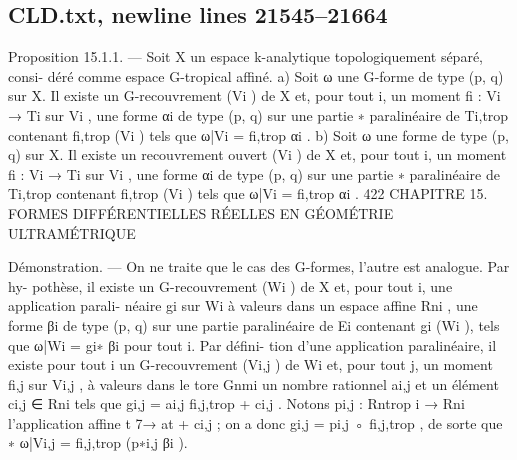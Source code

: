 \documentclass[
  10pt,
]{article}
\newenvironment{Shaded}{}{}
\newcommand{\NormalTok}[1]{#1}
\begin{document}
\subsection{CLD.txt, newline lines
21545--21664}\label{cld.txt-newline-lines-2154521664}

\begin{Shaded}
\begin{Highlighting}[]
\NormalTok{Proposition 15.1.1. — Soit X un espace k{-}analytique topologiquement séparé, consi{-}}
\NormalTok{déré comme espace G{-}tropical affiné.}
\NormalTok{   a) Soit ω une G{-}forme de type (p, q) sur X. Il existe un G{-}recouvrement (Vi ) de X et,}
\NormalTok{pour tout i, un moment fi : Vi → Ti sur Vi , une forme αi de type (p, q) sur une partie}
\NormalTok{                                                                 ∗}
\NormalTok{paralinéaire de Ti,trop contenant fi,trop (Vi ) tels que ω|Vi = fi,trop αi .}
\NormalTok{   b) Soit ω une forme de type (p, q) sur X. Il existe un recouvrement ouvert (Vi ) de X}
\NormalTok{et, pour tout i, un moment fi : Vi → Ti sur Vi , une forme αi de type (p, q) sur une partie}
\NormalTok{                                                                 ∗}
\NormalTok{paralinéaire de Ti,trop contenant fi,trop (Vi ) tels que ω|Vi = fi,trop αi .}
\NormalTok{422 CHAPITRE 15. FORMES DIFFÉRENTIELLES RÉELLES EN GÉOMÉTRIE ULTRAMÉTRIQUE}

\NormalTok{Démonstration. — On ne traite que le cas des G{-}formes, l’autre est analogue. Par hy{-}}
\NormalTok{pothèse, il existe un G{-}recouvrement (Wi ) de X et, pour tout i, une application parali{-}}
\NormalTok{néaire gi sur Wi à valeurs dans un espace affine Rni , une forme βi de type (p, q) sur une}
\NormalTok{partie paralinéaire de Ei contenant gi (Wi ), tels que ω|Wi = gi∗ βi pour tout i. Par défini{-}}
\NormalTok{tion d’une application paralinéaire, il existe pour tout i un G{-}recouvrement (Vi,j ) de Wi}
\NormalTok{et, pour tout j, un moment fi,j sur Vi,j , à valeurs dans le tore Gnmi un nombre rationnel}
\NormalTok{ai,j et un élément ci,j ∈ Rni tels que gi,j = ai,j fi,j,trop + ci,j . Notons pi,j : Rntrop}
\NormalTok{                                                                                        i}
\NormalTok{                                                                                           → Rni}
\NormalTok{l’application affine t 7→ at + ci,j ; on a donc gi,j = pi,j ◦ fi,j,trop , de sorte que}
\NormalTok{                                               ∗}
\NormalTok{                                     ω|Vi,j = fi,j,trop (p∗i,j βi ).}


\end{Highlighting}
\end{Shaded}
\end{document}
